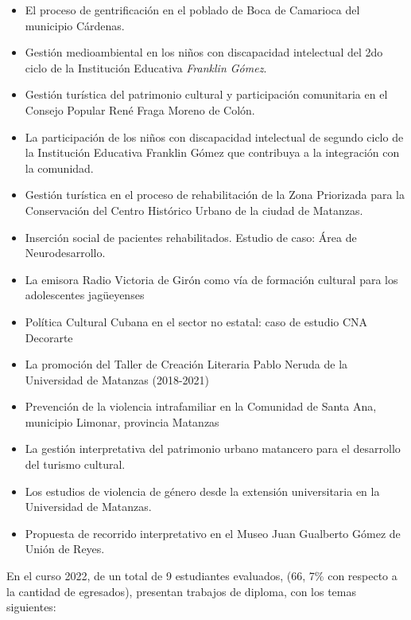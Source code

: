 \begin{itemize}
	\setlength\itemsep{-0.5em}
	\item El proceso de gentrificación en el poblado de Boca de Camarioca del municipio Cárdenas.
	\item Gestión medioambiental en los niños con discapacidad intelectual del 2do ciclo de la Institución Educativa \emph{Franklin Gómez}.
	\item Gestión turística del patrimonio cultural y participación comunitaria en el Consejo Popular René Fraga Moreno de Colón.
	\item La participación de los niños con discapacidad intelectual de segundo ciclo de la Institución Educativa Franklin Gómez que contribuya a la integración con la comunidad.
	\item Gestión turística en el proceso de rehabilitación de la Zona Priorizada para la Conservación del Centro Histórico Urbano de la ciudad de Matanzas.
	\item Inserción social de pacientes rehabilitados. Estudio de caso: Área de Neurodesarrollo.
	\item La emisora Radio Victoria de Girón como vía de formación cultural para los adolescentes jagüeyenses
	\item Política Cultural Cubana en el sector no estatal: caso de estudio CNA Decorarte
	\item La promoción del Taller de Creación Literaria Pablo Neruda de la Universidad de Matanzas (2018-2021)   
	\item Prevención de la violencia intrafamiliar en la Comunidad de Santa Ana, municipio Limonar, provincia Matanzas 
	\item La gestión interpretativa del patrimonio urbano matancero para el desarrollo del turismo cultural.
	\item Los estudios de violencia de género desde la extensión universitaria en la Universidad de Matanzas.   
	\item Propuesta de recorrido interpretativo en el Museo Juan Gualberto Gómez de Unión de Reyes.
\end{itemize}

En el curso 2022, de un total de 9 estudiantes evaluados, (66, 7\% con respecto a la cantidad de egresados), presentan trabajos de diploma, con los temas siguientes:

